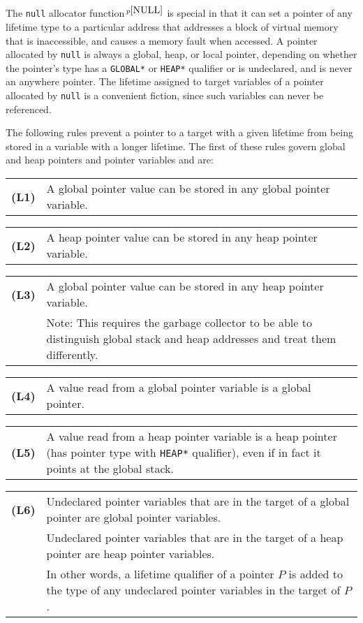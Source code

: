 \documentclass[12pt]{article}
\newcommand{\key}[1]{{\rm \bfseries #1}}
\newcommand{\pagnote}[1]{$\,^{p\pageref{#1}}$}
\newenvironment{indpar}[1][0.3in]%
	{\begin{list}{}%
		     {\setlength{\itemsep}{0in}%
		      \setlength{\topsep}{0in}%
		      \setlength{\parsep}{1ex}%
		      \setlength{\labelwidth}{#1}%
		      \setlength{\leftmargin}{#1}%
		      \addtolength{\leftmargin}{\labelsep}}%
	 \item}%
	{\end{list}}
\begin{document}
The {\tt null} allocator function\pagnote{NULL} is special in that
it can set a pointer of any lifetime type to a particular address
that addresses a block of virtual memory that is inaccessible, and
causes a memory fault when accessed.  A pointer allocated by {\tt null}
is always a global, heap, or local pointer, depending on whether
the pointer's type has a {\tt *GLOBAL*} or {\tt *HEAP*} qualifier
or is undeclared, and is never an anywhere pointer.
The lifetime assigned to target variables of a pointer allocated by {\tt null}
is a convenient fiction, since such variables can never be referenced.

The following rules prevent a pointer to a target with a given lifetime
from being stored in a variable with a longer lifetime.
The first of these rules govern global and heap pointers and
pointer variables and are:
\begin{indpar}[0.2in]
\begin{tabular}{p{0.5in}p{5.0in}}
\key{(L1)}	& A global pointer value
                  can be stored in any global pointer variable.
\end{tabular}

\begin{tabular}{p{0.5in}p{5.0in}}
\key{(L2)}	& A heap pointer value
                  can be stored in any heap pointer variable.
\end{tabular}

\begin{tabular}{p{0.5in}p{5.0in}}
\key{(L3)}
		& A global pointer value
                  can be stored in any heap pointer variable.
\\[1ex]
		& Note: This requires the garbage collector to be able
		  to distinguish global stack
		  and heap addresses and treat them differently.
\end{tabular}

\begin{tabular}{p{0.5in}p{5.0in}}
\key{(L4)}	& A value read from a global pointer variable is a
		  global pointer.
\end{tabular}

\begin{tabular}{p{0.5in}p{5.0in}}
\key{(L5)}	& A value read from a heap pointer variable is a
		  heap pointer (has pointer type with {\tt *HEAP*}
		  qualifier), even if in fact it points at the
		  global stack.
\end{tabular}

\begin{tabular}{p{0.5in}p{5.0in}}
\key{(L6)}	& Undeclared pointer variables that are in the target
                  of a global pointer are global pointer variables.
\\[1ex]
		& Undeclared pointer variables that are in the target
                  of a heap pointer are heap pointer variables.
\\[1ex]
		& In other words, a lifetime qualifier of a pointer $P$
		  is added to the type of any undeclared pointer variables
		  in the target of $P$.
\end{tabular}


\end{indpar}
\end{document}
